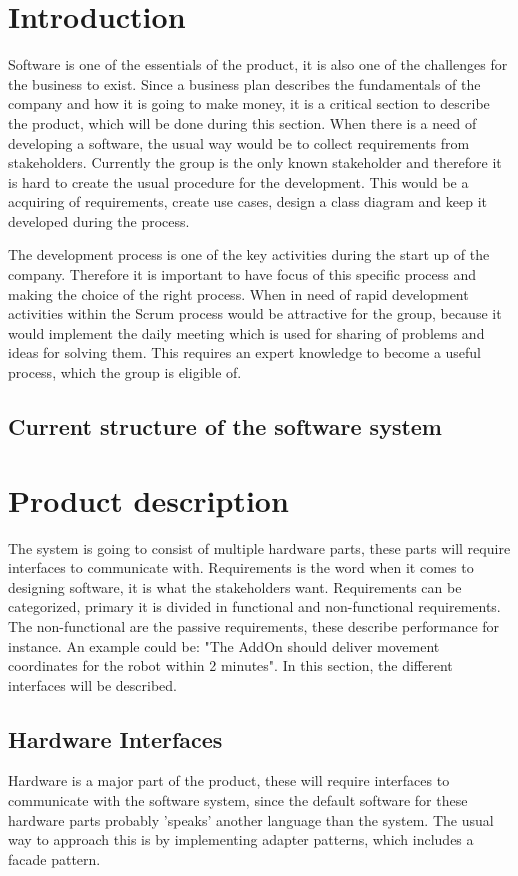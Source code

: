 \documentclass[12pt]{report} %
\begin{document}
\section{Introduction}
Software is one of the essentials of the product, it is also one of the challenges for the business to exist. Since a business plan describes the fundamentals of the company and how it is going to make money, it is a critical section to describe the product, which will be done during this section. When there is a need of developing a software, the usual way would be to collect requirements from stakeholders. Currently the group is the only known stakeholder and therefore it is hard to create the usual procedure for the development. This would be a acquiring of requirements, create use cases, design a class diagram and keep it developed during the process. 

The development process is one of the key activities during the start up of the company. Therefore it is important to have focus of this specific process and making the choice of the right process. When in need of rapid development activities within the Scrum process would be attractive for the group, because it would implement the daily meeting which is used for sharing of problems and ideas for solving them. This requires an expert knowledge to become a useful process, which the group is eligible of.

\subsection{Current structure of the software system}


\section{Product description}
The system is going to consist of multiple hardware parts, these parts will require interfaces to communicate with. Requirements is the word when it comes to designing software, it is what the stakeholders want. Requirements can be categorized, primary it is divided in functional and non-functional requirements. The non-functional are the passive requirements, these describe performance for instance. An example could be: "The AddOn should deliver movement coordinates for the robot within 2 minutes". In this section, the different interfaces will be described. 

\subsection{Hardware Interfaces}
Hardware is a major part of the product, these will require interfaces to communicate with the software system, since the default software for these hardware parts probably 'speaks' another language than the system. The usual way to approach this is by implementing adapter patterns, which includes a facade pattern. 
\end{document}
